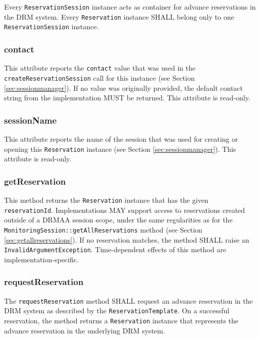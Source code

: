 \documentclass{article}
\newcommand{\h}[1]{\lstinline|#1|}
\begin{document}
Every \h{ReservationSession} instance acts as container for advance reservations in the DRM system. Every \h{Reservation} instance SHALL belong only to one \h{ReservationSession} instance. 



\subsubsection{contact}

This attribute reports the \h{contact} value that was used in the \h{createReservationSession} call for this instance (see Section \ref{sec:sessionmanager}). If no value was originally provided, the default contact string from the implementation MUST be returned. This attribute is read-only.

\subsubsection{sessionName}

This attribute reports the name of the session that was used for creating or opening this \h{Reservation} instance  (see Section \ref{sec:sessionmanager}). This attribute is read-only.

\subsubsection{getReservation}

This method returns the \h{Reservation} instance that has the given \h{reservationId}. Implementations MAY support access to reservations created outside of a DRMAA session scope, under the same regularities as for the \h{MonitoringSession::getAllReservations} method (see Section \ref{sec:getallreservations}). If no reservation matches, the method SHALL raise an \h{InvalidArgumentException}.  Time-dependent effects of this method are implementation-specific. 

\subsubsection{requestReservation}

The \h{requestReservation} method SHALL request an advance reservation in the DRM system as described by the \h{ReservationTemplate}. On a successful reservation, the method returns a \h{Reservation} instance that represents the advance reservation in the underlying DRM system.
\end{document}
